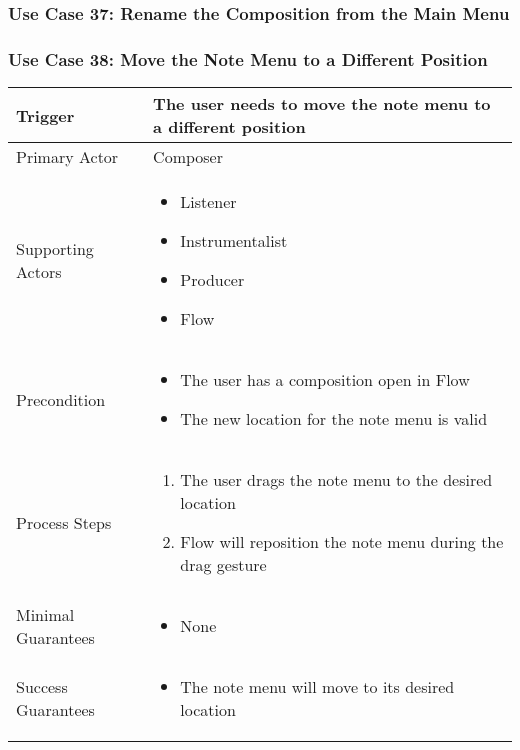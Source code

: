 
  \subsubsection{Use Case 37: Rename the Composition from the Main Menu}


  \subsubsection{Use Case 38: Move the Note Menu to a Different Position}

  \begin{tabularx}{\textwidth}{|X|X|}
  \hline
  Trigger & 
  The user needs to move the note menu to a different position\\
  \hline
  Primary Actor & 
  Composer \\
  \hline
  Supporting Actors & 
  \begin{itemize}
  \item Listener
  \item Instrumentalist
  \item Producer
  \item Flow
  \end{itemize} \\
  \hline
  Precondition & 
  \begin{itemize}
  \item The user has a composition open in Flow
  \item The new location for the note menu is valid
  \end{itemize} \\
  \hline
  Process Steps & 
  \begin{enumerate}
  \item The user drags the note menu to the desired location
  \item Flow will reposition the note menu during the drag gesture
  \end{enumerate} \\
  \hline
  Minimal Guarantees & 
  \begin{itemize}
    \item None
  \end{itemize} \\
  \hline
  Success Guarantees & 
  \begin{itemize}
    \item The note menu will move to its desired location
  \end{itemize} \\
  \hline
  \end{tabularx}

